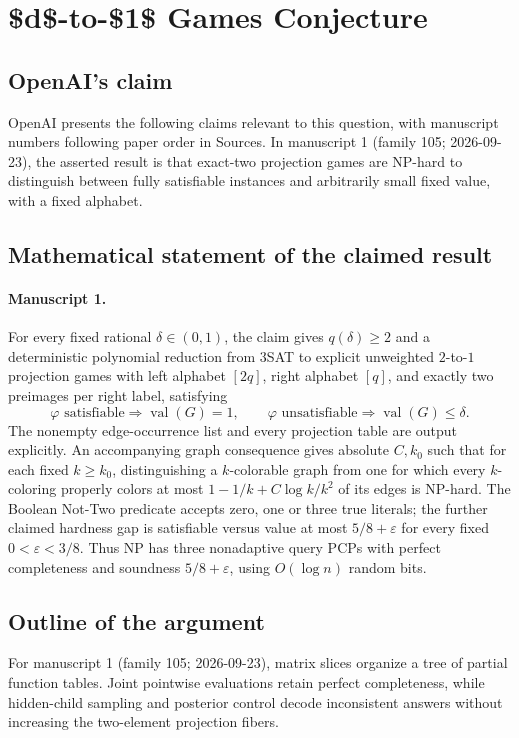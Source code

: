 \documentclass[11pt]{article}
\begin{document}
\section*{\$d\$-to-\$1\$ Games Conjecture}

\subsection{OpenAI's claim}
OpenAI presents the following claims relevant to this question, with manuscript numbers following paper order in Sources. In manuscript 1 (family 105; 2026-09-23), the asserted result is that exact-two projection games are NP-hard to distinguish between fully satisfiable instances and arbitrarily small fixed value, with a fixed alphabet.

\subsection{Mathematical statement of the claimed result}
\paragraph{Manuscript 1.}
For every fixed rational $\delta\in(0,1)$, the claim gives $q(\delta)\ge2$ and a deterministic polynomial reduction from $3$SAT to explicit unweighted $2$-to-$1$ projection games with left alphabet $[2q]$, right alphabet $[q]$, and exactly two preimages per right label, satisfying
\[
 \varphi\text{ satisfiable}\Rightarrow\operatorname{val}(G)=1,
 \qquad\varphi\text{ unsatisfiable}\Rightarrow\operatorname{val}(G)\le\delta.
\]
The nonempty edge-occurrence list and every projection table are output explicitly. An accompanying graph consequence gives absolute $C,k_0$ such that for each fixed $k\ge k_0$, distinguishing a $k$-colorable graph from one for which every $k$-coloring properly colors at most $1-1/k+C\log k/k^2$ of its edges is NP-hard. The Boolean Not-Two predicate accepts zero, one or three true literals; the further claimed hardness gap is satisfiable versus value at most $5/8+\varepsilon$ for every fixed $0<\varepsilon<3/8$. Thus NP has three nonadaptive query PCPs with perfect completeness and soundness $5/8+\varepsilon$, using $O(\log n)$ random bits.

\subsection{Outline of the argument}
For manuscript 1 (family 105; 2026-09-23), matrix slices organize a tree of partial function tables. Joint pointwise evaluations retain perfect completeness, while hidden-child sampling and posterior control decode inconsistent answers without increasing the two-element projection fibers.
\end{document}
